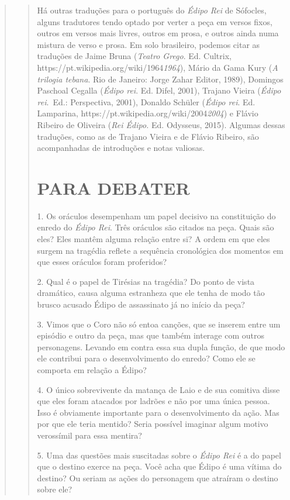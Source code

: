 \begin{verse}
\begin{verse}
Há outras traduções para o português do \emph{Édipo Rei} de Sófocles,
alguns tradutores tendo optado por verter a peça em versos fixos, outros
em versos mais livres, outros em prosa, e outros ainda numa mistura de
verso e prosa. Em solo brasileiro, podemos citar as traduções de Jaime
Bruna (\emph{Teatro Grego}. Ed.
Cultrix, {https://pt.wikipedia.org/wiki/1964}{\emph{1964}}), Mário
da Gama Kury (\emph{A trilogia tebana}. Rio de Janeiro: Jorge Zahar
Editor, 1989), Domingos Paschoal Cegalla (\emph{Édipo rei}. Ed. Difel,
2001), Trajano Vieira (\emph{Édipo rei}.~Ed.: Perspectiva, 2001),
Donaldo Schüler (\emph{Édipo rei}. Ed.
Lamparina, {https://pt.wikipedia.org/wiki/2004}{\emph{2004}}) e
Flávio Ribeiro de Oliveira (\emph{Rei Édipo.} Ed. Odysseus, 2015).
Algumas dessas traduções, como as de Trajano Vieira e de Flávio Ribeiro,
são acompanhadas de introduções e notas valiosas.

\chapter{PARA DEBATER}

1. Os oráculos desempenham um papel decisivo na constituição do enredo
do \emph{Édipo Rei}. Três oráculos são citados na peça. Quais são eles?
Eles mantêm alguma relação entre si? A ordem em que eles surgem na
tragédia reflete a sequência cronológica dos momentos em que esses
oráculos foram proferidos?

2. Qual é o papel de Tirésias na tragédia? Do ponto de vista dramático,
causa alguma estranheza que ele tenha de modo tão brusco acusado Édipo
de assassinato já no início da peça?

3. Vimos que o Coro não só entoa canções, que se inserem entre um
episódio e outro da peça, mas que também interage com outros
personagens. Levando em contra essa sua dupla função, de que modo ele
contribui para o desenvolvimento do enredo? Como ele se comporta em
relação a Édipo?

4. O único sobrevivente da matança de Laio e de sua comitiva disse que
eles foram atacados por ladrões e não por uma única pessoa. Isso é
obviamente importante para o desenvolvimento da ação. Mas por que ele
teria mentido? Seria possível imaginar algum motivo verossímil para essa
mentira?

5. Uma das questões mais suscitadas sobre o \emph{Édipo Rei} é a do
papel que o destino exerce na peça. Você acha que Édipo é uma vítima do
destino? Ou seriam as ações do personagem que atraíram o destino sobre
ele?


\end{verse}
\end{verse}
